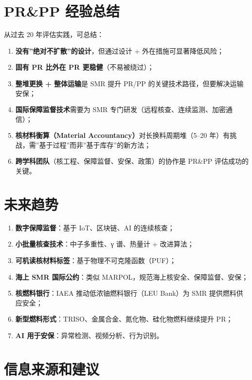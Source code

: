\documentclass[
  UTF8,
  scheme=plain,
  fontsize=10pt,
  openany
]{ctexbook}
\begin{document}
\section{PR\&PP 经验总结}\label{prpp-ux7ecfux9a8cux603bux7ed3}

从过去 20 年评估实践，可总结：

\begin{enumerate}
\def\labelenumi{\arabic{enumi}.}
\tightlist
\item
  \textbf{没有''绝对不扩散''的设计}，但通过设计 +
  外在措施可显著降低风险；
\item
  \textbf{固有 PR 比外在 PR 更稳健}（不易被绕过）；
\item
  \textbf{整堆更换 + 整体运输}是 SMR 提升 PR/PP
  的关键技术路径，但要解决运输安保；
\item
  \textbf{国际保障监督技术}需要为 SMR
  专门研发（远程核查、连续监测、加密通信）；
\item
  \textbf{核材料衡算（Material Accountancy）}对长换料周期堆（5--20
  年）有挑战，需''基于过程''而非''基于库存''的新方法；
\item
  \textbf{跨学科团队}（核工程、保障监督、安保、政策）的协作是 PR\&PP
  评估成功的关键。
\end{enumerate}

\section{未来趋势}\label{ux672aux6765ux8d8bux52bf}

\begin{enumerate}
\def\labelenumi{\arabic{enumi}.}
\tightlist
\item
  \textbf{数字保障监督}：基于 IoT、区块链、AI 的连续核查；
\item
  \textbf{小批量核查技术}：中子多重性、γ 谱、热量计 + 改进算法；
\item
  \textbf{可机读核材料标签}：基于物理不可克隆函数（PUF）；
\item
  \textbf{海上 SMR 国际公约}：类似
  MARPOL，规范海上核安全、保障监督、安保；
\item
  \textbf{核燃料银行}：IAEA 推动低浓铀燃料银行（LEU Bank）为 SMR
  提供燃料供应安全；
\item
  \textbf{新型燃料形式}：TRISO、金属合金、氮化物、硅化物燃料继续提升
  PR；
\item
  \textbf{AI 用于安保}：异常检测、视频分析、行为识别。
\end{enumerate}

\section{信息来源和建议}\label{ux4fe1ux606fux6765ux6e90ux548cux5efaux8bae}
\end{document}
